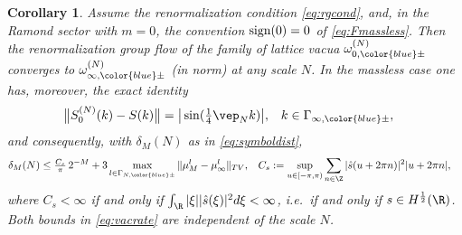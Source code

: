 \documentclass[a4paper, 11pt]{article}
\DeclareMathOperator{\1}{\mathds{1}}
\DeclareMathOperator{\sign}{\textup{sign}}
\newtheorem{cor}[thm]{Corollary}
\begin{document}
\begin{cor}
\label{cor:stateconv}
Assume the renormalization condition \eqref{eq:rgcond}, and, in the Ramond sector with $m=0$, the convention $\sign(0)=0$ of \eqref{eq:Fmassless}. Then the renormalization group flow of the family of lattice vacua $\omega^{(N)}_{0,{\color{blue}\pm}}$ converges to $\omega^{(N)}_{\infty,{\color{blue}\pm}}$ (in norm) at any scale $N$. In the massless case one has, moreover, the exact identity
\begin{align}
\label{eq:vacsymbolerror}
\big\|S^{(N)}_{0}(k)-S(k)\big\| & = \big|\sin(\tfrac{1}{4}\vep_{N}k)\big|, & k & \in\Gamma_{\infty,{\color{blue}\pm}},
\end{align}
and consequently, with $\delta_{M}(N)$ as in \eqref{eq:symboldist},
\begin{align}
\label{eq:vacrate}
\delta_{M}(N) & \leq \tfrac{C_{s}}{\pi}\!\ 2^{-M} + 3\max_{l\in\Gamma_{N,{\color{blue}\pm}}}\|\mu^{l}_{M}-\mu^{l}_{\infty}\|_{TV}, & C_{s} & := \sup_{u\in[-\pi,\pi)}\sum_{n\in\Z}|\hat{s}(u+2\pi n)|^{2}|u+2\pi n| ,
\end{align}
where $C_{s}<\infty$ if and only if $\int_{\R}|\xi||\hat{s}(\xi)|^{2}d\xi<\infty$, i.e.~if and only if $s\in H^{\frac{1}{2}}(\R)$. Both bounds in \eqref{eq:vacrate} are independent of the scale $N$.
\end{cor}
\end{document}
